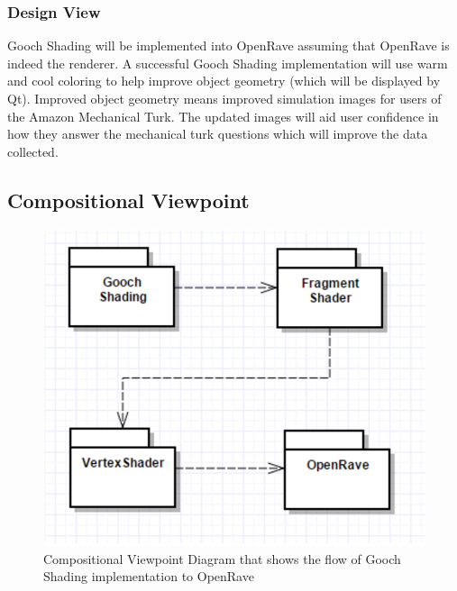 \documentclass[10pt,journal,compsoc,draftclsnofoot]{IEEEtran}
\begin{document}
\begin{flushleft}
\subsubsection{Design View}
Gooch Shading will be implemented into OpenRave assuming that OpenRave is indeed the renderer.
A successful Gooch Shading implementation will use warm and cool coloring to help improve object geometry (which will be displayed by Qt).
Improved object geometry means improved simulation images for users of the Amazon Mechanical Turk.
The updated images will aid user confidence in how they answer the mechanical turk questions which will improve the data collected.

\subsection{Compositional Viewpoint}

\begin{figure} [H]
  \includegraphics[scale=0.9]{Gooch_Shading2_composition.eps}
  \caption
{ \newline \hspace{\linewidth}
Compositional Viewpoint Diagram that shows the flow of Gooch Shading implementation to OpenRave}
  \label{fig:Gooch_Shading2_composition}
\end{figure}


\end{flushleft}
\end{document}
